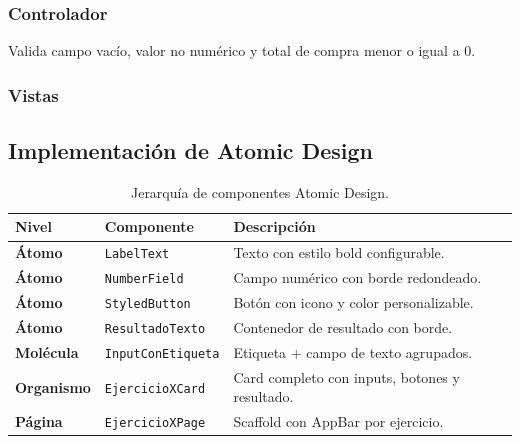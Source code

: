 \documentclass{article}
\begin{document}
\subsubsection{Controlador}
Valida campo vacío, valor no numérico y total de compra menor o igual a 0.

\subsubsection{Vistas}
\begin{figure}[H]
\centering
\begin{minipage}{0.45\textwidth}\centering
\end{minipage}\hfill
\begin{minipage}{0.45\textwidth}\centering
\end{minipage}
\end{figure}

\newpage

\subsection{Implementación de Atomic Design}

\begin{table}[H]
\centering
\begin{tabularx}{\textwidth}{l|l|X}
\rowcolor{codeframe} \textbf{Nivel} & \textbf{Componente} & \textbf{Descripción} \\ \hline
\textbf{Átomo} & \texttt{LabelText} & Texto con estilo bold configurable. \\ \hline
\textbf{Átomo} & \texttt{NumberField} & Campo numérico con borde redondeado. \\ \hline
\textbf{Átomo} & \texttt{StyledButton} & Botón con icono y color personalizable. \\ \hline
\textbf{Átomo} & \texttt{ResultadoTexto} & Contenedor de resultado con borde. \\ \hline
\textbf{Molécula} & \texttt{InputConEtiqueta} & Etiqueta + campo de texto agrupados. \\ \hline
\textbf{Organismo} & \texttt{EjercicioXCard} & Card completo con inputs, botones y resultado. \\ \hline
\textbf{Página} & \texttt{EjercicioXPage} & Scaffold con AppBar por ejercicio. \\
\end{tabularx}
\caption{Jerarquía de componentes Atomic Design.}
\end{table}
\end{document}
